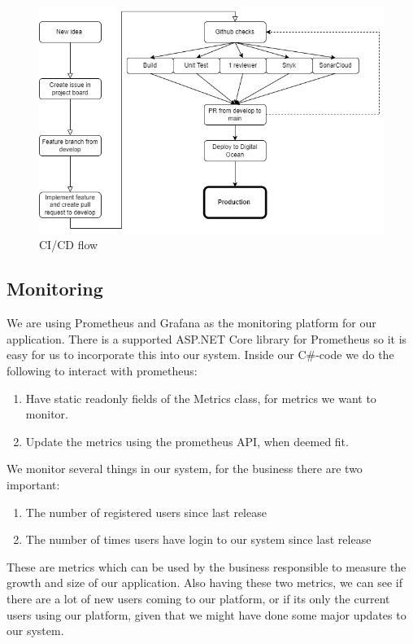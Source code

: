 \documentclass[10pt]{article}
\begin{document}
\begin{figure}[H]
    \centering
    \includegraphics[width=\textwidth]{images/flow.PNG}
    \caption{CI/CD flow}
    \label{fig:flow}
\end{figure}


\subsection{Monitoring}
We are using Prometheus and Grafana as the monitoring platform for our application. There is a supported ASP.NET Core library for Prometheus so it is  easy for us to incorporate this into our system.
Inside our C\#-code we do the following to interact with prometheus:
\begin{enumerate}
    \item Have static readonly fields of the Metrics class, for metrics we want to monitor.
    \item Update the metrics using the prometheus API, when deemed fit.
\end{enumerate}

We monitor several things in our system, for the business there are two important:
\begin{enumerate}
    \item The number of registered users since last release
    \item The number of times users have login to our system since last release 
\end{enumerate}
These are metrics which can be used by the business responsible to measure the growth and size of our application. Also having these two metrics, we can see if there are a lot of new users coming to our platform, or if its only the current users using our platform, given that we might have done some major updates to our system.
\end{document}
